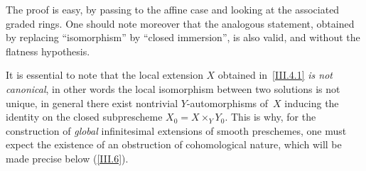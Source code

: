 The proof is easy, by passing to the affine case and looking at the
associated graded rings. One should note moreover that the analogous
statement, obtained by replacing ``isomorphism'' by ``closed
immersion'', is also valid, and without the flatness hypothesis.

\begin{remark}
\label{III.4.3}
It is essential to note that the local extension $X$ obtained in~\ref{III.4.1}
\emph{is not canonical}, in other words the local isomorphism between
two solutions is not unique, \ie in general there exist nontrivial
$Y$-automorphisms of~$X$ inducing the identity on the closed
subprescheme $X_0=X\times_Y Y_0$. This is why, for the construction
of \emph{global} infinitesimal extensions of smooth preschemes, one
must expect the existence of an obstruction of cohomological nature,
which will be made precise below (\No\ref{III.6}).
\end{remark}
